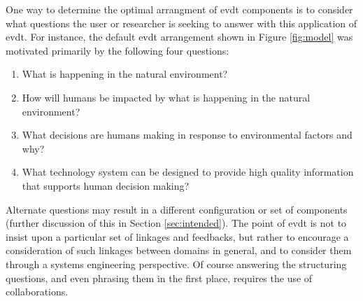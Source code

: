 One way to determine the optimal arrangment of \ac{evdt} components is to consider what questions the user or researcher is seeking to answer with this application of \ac{evdt}. For instance, the default \ac{evdt} arrangement shown in Figure \ref{fig:model} was motivated primarily by the following four questions:

\begin{enumerate} \setlength{\itemsep}{0pt} \setlength{\parskip}{0pt}
    \item What is happening in the natural environment?
    \item How will humans be impacted by what is happening in the natural environment?
    \item What decisions are humans making in response to environmental factors and why?
    \item What technology system can be designed to provide high quality information that supports human decision making?
\end{enumerate}

Alternate questions may result in a different configuration or set of components (further discussion of this in Section \ref{sec:intended}). The point of \ac{evdt} is not to insist upon a particular set of linkages and feedbacks, but rather to encourage a consideration of such linkages between domains in general, and to consider them through a systems engineering perspective. Of course answering the structuring questions, and even phrasing them in the first place, requires the use of collaborations.

\subsection{} 

